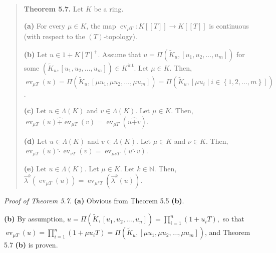 \documentclass[12pt,final,notitlepage,onecolumn,german]{article}%
\begin{document}
\begin{quote}
\textbf{Theorem 5.7.} Let $K$ be a ring.

\textbf{(a)} For every $\mu\in K$, the map $\operatorname*{ev}_{\mu
T}:K\left[  \left[  T\right]  \right]  \rightarrow K\left[  \left[  T\right]
\right]  $ is continuous (with respect to the $\left(  T\right)  $-topology).

\textbf{(b)} Let $u\in1+K\left[  T\right]  ^{+}$. Assume that $u=\Pi\left(
\widetilde{K}_{u},\left[  u_{1},u_{2},...,u_{m}\right]  \right)  $ for some
$\left(  \widetilde{K}_{u},\left[  u_{1},u_{2},...,u_{m}\right]  \right)  \in
K^{\operatorname*{int}}$. Let $\mu\in K$. Then, $\operatorname*{ev}_{\mu
T}\left(  u\right)  =\Pi\left(  \widetilde{K}_{u},\left[  \mu u_{1},\mu
u_{2},...,\mu u_{m}\right]  \right)  =\Pi\left(  \widetilde{K}_{u},\left[  \mu
u_{i}\mid i\in\left\{  1,2,...,m\right\}  \right]  \right)  $.

\textbf{(c)} Let $u\in\Lambda\left(  K\right)  $ and $v\in\Lambda\left(
K\right)  $. Let $\mu\in K$. Then, $\operatorname*{ev}_{\mu T}\left(
u\right)  \widehat{+}\operatorname*{ev}_{\mu T}\left(  v\right)
=\operatorname*{ev}_{\mu T}\left(  u\widehat{+}v\right)  $.

\textbf{(d)} Let $u\in\Lambda\left(  K\right)  $ and $v\in\Lambda\left(
K\right)  $. Let $\mu\in K$ and $\nu\in K$. Then, $\operatorname*{ev}_{\mu
T}\left(  u\right)  \widehat{\cdot}\operatorname*{ev}_{\nu T}\left(  v\right)
=\operatorname*{ev}_{\mu\nu T}\left(  u\widehat{\cdot}v\right)  $.

\textbf{(e)} Let $u\in\Lambda\left(  K\right)  $. Let $\mu\in K$. Let
$k\in\mathbb{N}$. Then, $\widehat{\lambda}^{k}\left(  \operatorname*{ev}_{\mu
T}\left(  u\right)  \right)  =\operatorname*{ev}_{\mu^{k}T}\left(
\widehat{\lambda}^{k}\left(  u\right)  \right)  $.
\end{quote}

\textit{Proof of Theorem 5.7.} \textbf{(a)} Obvious from Theorem 5.5
\textbf{(b)}.

\textbf{(b)} By assumption, $u=\Pi\left(  \widetilde{K},\left[  u_{1}%
,u_{2},...,u_{n}\right]  \right)  =\prod\limits_{i=1}^{n}\left(
1+u_{i}T\right)  ,$ so that $\operatorname*{ev}_{\mu T}\left(  u\right)
=\prod\limits_{i=1}^{n}\left(  1+\mu u_{i}T\right)  =\Pi\left(  \widetilde
{K}_{u},\left[  \mu u_{1},\mu u_{2},...,\mu u_{m}\right]  \right)  $, and
Theorem 5.7 \textbf{(b)} is proven.
\end{document}
